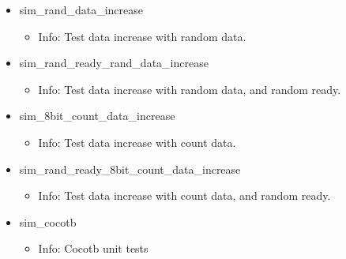 \begin{itemize}
\begin{itemize}
	\end{itemize}
\item sim\_rand\_data\_increase
	\begin{itemize}
	\item[$\space$] Info: Test data increase with random data.
	\end{itemize}
\item sim\_rand\_ready\_rand\_data\_increase
	\begin{itemize}
	\item[$\space$] Info: Test data increase with random data, and random ready.
	\end{itemize}
\item sim\_8bit\_count\_data\_increase
	\begin{itemize}
	\item[$\space$] Info: Test data increase with count data.
	\end{itemize}
\item sim\_rand\_ready\_8bit\_count\_data\_increase
	\begin{itemize}
	\item[$\space$] Info: Test data increase with count data, and random ready.
	\end{itemize}
\item sim\_cocotb
	\begin{itemize}
	\item[$\space$] Info: Cocotb unit tests
	\end{itemize}
\end{itemize}

